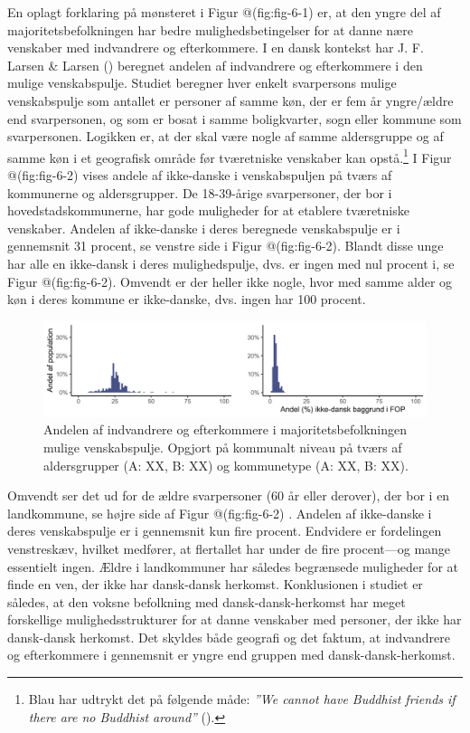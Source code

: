 \documentclass[
]{book}
\begin{document}
En oplagt forklaring på mønsteret i Figur @(fig:fig-6-1) er, at den yngre del af majoritetsbefolkningen har bedre mulighedsbetingelser for at danne nære venskaber med indvandrere og efterkommere. I en dansk kontekst har J. F. Larsen \& Larsen () beregnet andelen af indvandrere og efterkommere i den mulige venskabspulje. Studiet beregner hver enkelt svarpersons mulige venskabspulje som antallet er personer af samme køn, der er fem år yngre/ældre end svarpersonen, og som er bosat i samme boligkvarter, sogn eller kommune som svarpersonen. Logikken er, at der skal være nogle af samme aldersgruppe og af samme køn i et geografisk område før tværetniske venskaber kan opstå.\footnote{Blau har udtrykt det på følgende måde: \emph{''We cannot have Buddhist friends if there are no Buddhist around''} ().} I Figur @(fig:fig-6-2) vises andele af ikke-danske i venskabspuljen på tværs af kommunerne og aldersgrupper. De 18-39-årige svarpersoner, der bor i hovedstadskommunerne, har gode muligheder for at etablere tværetniske venskaber. Andelen af ikke-danske i deres beregnede venskabspulje er i gennemsnit 31 procent, se venstre side i Figur @(fig:fig-6-2). Blandt disse unge har alle en ikke-dansk i deres mulighedspulje, dvs. er ingen med nul procent i, se Figur @(fig:fig-6-2). Omvendt er der heller ikke nogle, hvor med samme alder og køn i deres kommune er ikke-danske, dvs. ingen har 100 procent.

\begin{figure}
\includegraphics[width=1\linewidth]{images/Figur_6_2} \caption{Andelen af indvandrere og efterkommere i majoritetsbefolkningen mulige venskabspulje. Opgjort på kommunalt niveau på tværs af aldersgrupper (A: XX, B: XX) og kommunetype (A: XX, B: XX).}\label{fig:fig-6-2}
\end{figure}

Omvendt ser det ud for de ældre svarpersoner (60 år eller derover), der bor i en landkommune, se højre side af Figur @(fig:fig-6-2) . Andelen af ikke-danske i deres venskabspulje er i gennemsnit kun fire procent. Endvidere er fordelingen venstreskæv, hvilket medfører, at flertallet har under de fire procent---og mange essentielt ingen. Ældre i landkommuner har således begrænsede muligheder for at finde en ven, der ikke har dansk-dansk herkomst. Konklusionen i studiet er således, at den voksne befolkning med dansk-dansk-herkomst har meget forskellige mulighedsstrukturer for at danne venskaber med personer, der ikke har dansk-dansk herkomst. Det skyldes både geografi og det faktum, at indvandrere og efterkommere i gennemsnit er yngre end gruppen med dansk-dansk-herkomst.
\end{document}
